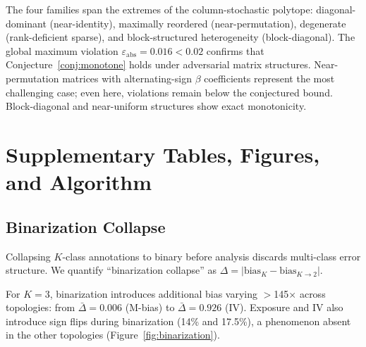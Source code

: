 \begin{table}[H]
\centering
\small
\caption{Adversarial monotonicity test across $K{=}3,5,7$ and seven topologies.}
\label{tab:adversarial_monotonicity}
\end{table}

The four families span the extremes of the column-stochastic polytope: diagonal-dominant (near-identity), maximally reordered (near-permutation), degenerate (rank-deficient sparse), and block-structured heterogeneity (block-diagonal). The global maximum violation $\varepsilon_{\mathrm{abs}} = 0.016 < 0.02$ confirms that Conjecture~\ref{conj:monotone} holds under adversarial matrix structures. Near-permutation matrices with alternating-sign $\beta$ coefficients represent the most challenging case; even here, violations remain below the conjectured bound. Block-diagonal and near-uniform structures show exact monotonicity.

\section{Supplementary Tables, Figures, and Algorithm}
\label{app:supplementary}

\subsection{Binarization Collapse}
\label{app:binarization}

Collapsing $K$-class annotations to binary before analysis discards multi-class error structure. We quantify ``binarization collapse'' as $\Delta = |\text{bias}_{K} - \text{bias}_{K \to 2}|$.

For $K{=}3$, binarization introduces additional bias varying $>$145$\times$ across topologies: from $\bar{\Delta}{=}0.006$ (M-bias) to $\bar{\Delta}{=}0.926$ (IV). Exposure and IV also introduce sign flips during binarization (14\% and 17.5\%), a phenomenon absent in the other topologies (Figure~\ref{fig:binarization}).


